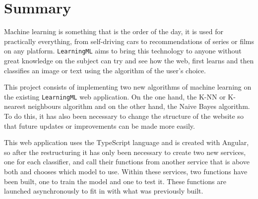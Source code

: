 \documentclass[a4paper, 12pt]{book}
\begin{document}

\chapter*{Summary}

Machine learning is something that is the order of the day, it is used for practically everything, from self-driving cars to recommendations of series or films on any platform. \texttt{LearningML} aims to bring this technology to anyone without great knowledge on the subject can try and see how the web, first learns and then classifies an image or text using the algorithm of the user's choice.

This project consists of implementing two new algorithms of machine learning on the existing \texttt{LearningML} web application. On the one hand, the K-NN or K-nearest neighbours algorithm and on the other hand, the Naive Bayes algorithm. To do this, it has also been necessary to change the structure of the website so that future updates or improvements can be made more easily.

This web application uses the TypeScript language and is created with Angular, so after the restructuring it has only been necessary to create two new services, one for each classifier, and call their functions from another service that is above both and chooses which model to use. Within these services, two functions have been built, one to train the model and one to test it. These functions are launched asynchronously to fit in with what was previously built.






\tableofcontents 
\cleardoublepage
\listoffigures %
\end{document}
